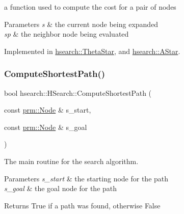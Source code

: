 a function used to compute the cost for a pair of nodes 


\begin{DoxyParams}{Parameters}
{\em s} & the current node being expanded \\
\hline
{\em sp} & the neighbor node being evaluated \\
\hline
\end{DoxyParams}


Implemented in \hyperlink{classhsearch_1_1ThetaStar_a852af6d668cbb3f58079125ba5740853}{hsearch\+::\+Theta\+Star}, and \hyperlink{classhsearch_1_1AStar_a3a9a3c398437d9efe0b9943c29a8672b}{hsearch\+::\+A\+Star}.

\mbox{\label{classhsearch_1_1HSearch_a8641b99479bbdf017bf5a1168b763c27}} 
\subsubsection{\texorpdfstring{Compute\+Shortest\+Path()}{ComputeShortestPath()}}
{\footnotesize\ttfamily bool hsearch\+::\+H\+Search\+::\+Compute\+Shortest\+Path (\begin{DoxyParamCaption}\item[{const \hyperlink{structprm_1_1Node}{prm\+::\+Node} \&}]{s\+\_\+start,  }\item[{const \hyperlink{structprm_1_1Node}{prm\+::\+Node} \&}]{s\+\_\+goal }\end{DoxyParamCaption})\hspace{0.3cm}{\ttfamily [virtual]}}



The main routine for the search algorithm. 


\begin{DoxyParams}{Parameters}
{\em s\+\_\+start} & the starting node for the path \\
\hline
{\em s\+\_\+goal} & the goal node for the path \\
\hline
\end{DoxyParams}
\begin{DoxyReturn}{Returns}
True if a path was found, otherwise False 
\end{DoxyReturn}
\mbox{\label{classhsearch_1_1HSearch_a6ca884af67da489fa1b20592abc1dbba}} 
